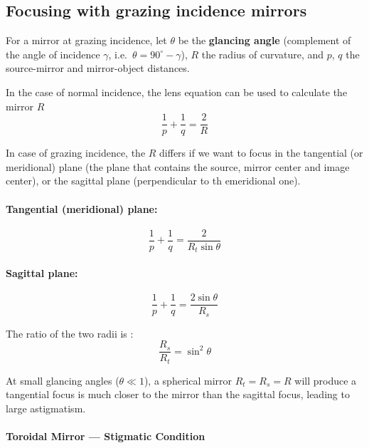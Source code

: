 \subsection{Focusing with grazing incidence mirrors }

\noindent
For a mirror at grazing incidence, let $\theta$ be the \textbf{glancing angle}
(complement of the angle of incidence $\gamma$, i.e.\ $\theta = 90^\circ - \gamma$),
$R$ the radius of curvature, and $p$, $q$ the source-mirror and mirror-object distances.

In the case of normal incidence, the lens equation can be used to calculate the mirror $R$
\begin{equation}
    \frac{1}{p} + \frac{1}{q} = \frac{2}{R}
\end{equation}

In case of grazing incidence, the $R$ differs if we want to focus in the tangential (or meridional) plane (the plane that contains the source, mirror center and image center), or the sagittal plane (perpendicular to th emeridional one).  

\paragraph{Tangential (meridional) plane:}
\begin{equation}
    \frac{1}{p} + \frac{1}{q} = \frac{2}{R_t \sin\theta}
\end{equation}

\paragraph{Sagittal plane:}
\begin{equation}
    \frac{1}{p} + \frac{1}{q} = \frac{2\sin\theta}{R_s}
\end{equation}


The ratio of the two radii is :
\begin{equation}
    \frac{R_s}{R_t} = \sin^2\theta
\end{equation}

\noindent
At small glancing angles ($\theta \ll 1$), a spherical mirror $R_t=R_s=R$ will produce a tangential focus is much closer to the mirror than the sagittal focus, leading to large astigmatism.

\paragraph{Toroidal Mirror --- Stigmatic Condition}

